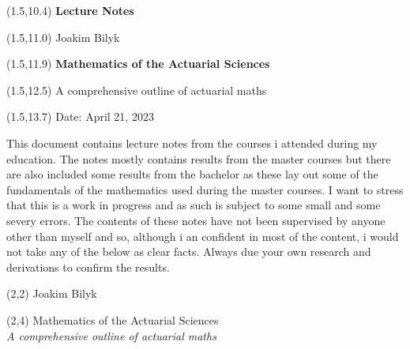 \documentclass[a4paper,12pt,openany]{book}
\begin{document}
\thispagestyle{empty}

\begin{textblock}{12}(1.5,10.4) \noindent\fontsize{20}{20}\selectfont \textbf{Lecture Notes}
\end{textblock}

\begin{textblock}{12}(1.5,11.0) \noindent\fontsize{14}{14}\selectfont Joakim Bilyk
\end{textblock}

\begin{textblock}{12}(1.5,11.9)
\noindent\fontsize{20}{20}\selectfont \textbf{Mathematics of the Actuarial Sciences}
\end{textblock}

\begin{textblock}{12}(1.5,12.5)
    \noindent\fontsize{14}{14}\selectfont A comprehensive outline of actuarial maths
\end{textblock}

\begin{textblock}{12}(1.5,13.7)
\noindent\fontsize{11}{11}\selectfont Date: April 21, 2023
\end{textblock}

\hspace{1pt}
\newpage

\onehalfspacing
\thispagestyle{empty}
\noindent

This document contains lecture notes from the courses i attended during my education. The notes mostly contains results from the master courses but there are also included some results from the bachelor as these lay out some of the fundamentals of the mathematics used during the master courses. I want to stress that this is a work in progress and as such is subject to some small and some severy errors. The contents of these notes have not been supervised by anyone other than myself and so, although i an confident in most of the content, i would not take any of the below as clear facts. Always due your own research and derivations to confirm the results.

\newpage

\thispagestyle{empty}

\begin{textblock}{12}(2,2)
\noindent\fontsize{20}{20}\selectfont Joakim Bilyk
\end{textblock}

\begin{textblock}{12}(2,4)
\noindent\fontsize{35pt}{40pt}\selectfont Mathematics of the Actuarial Sciences\\
\fontsize{20pt}{40pt}\selectfont \emph{A comprehensive outline of actuarial maths}
\end{textblock}
\end{document}
